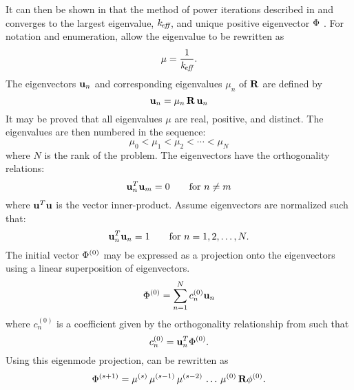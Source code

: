     It can then be shown in that the method of power iterations described in 
     and 
    converges to the largest eigenvalue, $k_{\!\mbox{\scriptsize \em eff}}$, and unique positive 
    eigenvector $\Phi$ \cite{nakamura}. For notation and enumeration, allow the 
    eigenvalue to be rewritten as
    \begin{equation}
      \label{eq:mu}
      \mu = \frac{1}{k_{\!\mbox{\scriptsize \em eff}}}.
    \end{equation}
    The eigenvectors $\mathbf{u}_n$ and
    corresponding eigenvalues $\mu_n$ of $\mathbf{R}$ are defined by
    \begin{equation}
      \label{eq:eigen_definition}
      \mathbf{u}_n = \mu_n \, \mathbf{R} \, \mathbf{u}_n
    \end{equation}
    It may be proved that all eigenvalues $\mu$ are real, positive, and 
    distinct. The eigenvalues are then numbered in the sequence:
    \begin{equation}
      \label{eq:eigen_order}
      \mu_0 < \mu_1 < \mu_2 < \cdots < \mu_N
    \end{equation}
    where $N$ is the rank of the problem. The eigenvectors have the 
    orthogonality relations:
    \begin{equation}
      \label{eq:eigen_orthogonality}
      \mathbf{u}^T_n \mathbf{u}_m = 0  \qquad \text{for } n \ne m
    \end{equation}
    where $\mathbf{u}^T \mathbf{u}$ is the vector inner-product. Assume eigenvectors are
    normalized such that:
    \begin{equation}
      \label{eq:eigen_normalization}
      \mathbf{u}_n^T \mathbf{u}_n = 1 \qquad \text{for } n = 1, 2, \ldots, N.
    \end{equation}
    The initial vector $\Phi^{(0)}$ may be expressed as a projection onto the
    eigenvectors using a linear superposition of eigenvectors.
    \begin{equation}
      \label{eq:eigen_projection}
      \Phi^{(0)} = \sum_{n=1}^{N} c_n^{(0)} \mathbf{u}_n
    \end{equation}
    where $c_n^{(0)}$ is a coefficient given by the orthogonality relationship
    from  such that
    \begin{equation}
      \label{eq:eigen_cn}
      c_n^{(0)} = \mathbf{u}_n^T \Phi^{(0)}.
    \end{equation}
    Using this eigenmode projection,  can be
    rewritten as 
    \begin{equation}
      \label{eq:phi_expand_begin}
      \Phi^{(s+1)} = \mu^{(s)} \, \mu^{(s-1)} \, \mu^{(s-2)} \, 
        \ldots \, \mu^{(0)} \, \mathbf{R} \phi^{(0)}.
    \end{equation}
